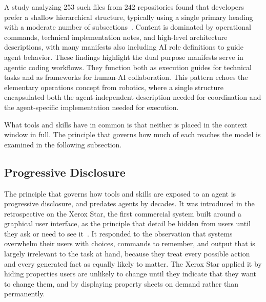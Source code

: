 \documentclass[
english,                 %
bibtex,                  %
]{kththesis}
\numberwithin{listing}{chapter}
\begin{document}
A study analyzing 253 such files from 242 repositories found that developers prefer a shallow hierarchical structure, typically using a single primary heading with a moderate number of subsections~\cite{scanniello_use_2026}. Content is dominated by operational commands, technical implementation notes, and high-level architecture descriptions, with many manifests also including \gls{AI} role definitions to guide agent behavior. These findings highlight the dual purpose manifests serve in agentic coding workflows. They function both as execution guides for technical tasks and as frameworks for human-\gls{AI} collaboration. This pattern echoes the elementary operations concept from robotics, where a single structure encapsulated both the agent-independent description needed for coordination and the agent-specific implementation needed for execution.

What tools and skills have in common is that neither is placed in the context window in full. The principle that governs how much of each reaches the model is examined in the following subsection.

\subsection{Progressive Disclosure}
\label{sec:bg_progressive_disclosure}
\glsresetall

The principle that governs how tools and skills are exposed to an agent is progressive disclosure, and predates agents by decades. It was introduced in the retrospective on the Xerox Star, the first commercial system built around a graphical user interface, as the principle that detail be hidden from users until they ask or need to see it~\cite{johnson_xerox_1989}. It responded to the observation that systems overwhelm their users with choices, commands to remember, and output that is largely irrelevant to the task at hand, because they treat every possible action and every generated fact as equally likely to matter. The Xerox Star applied it by hiding properties users are unlikely to change until they indicate that they want to change them, and by displaying property sheets on demand rather than permanently.
\end{document}
